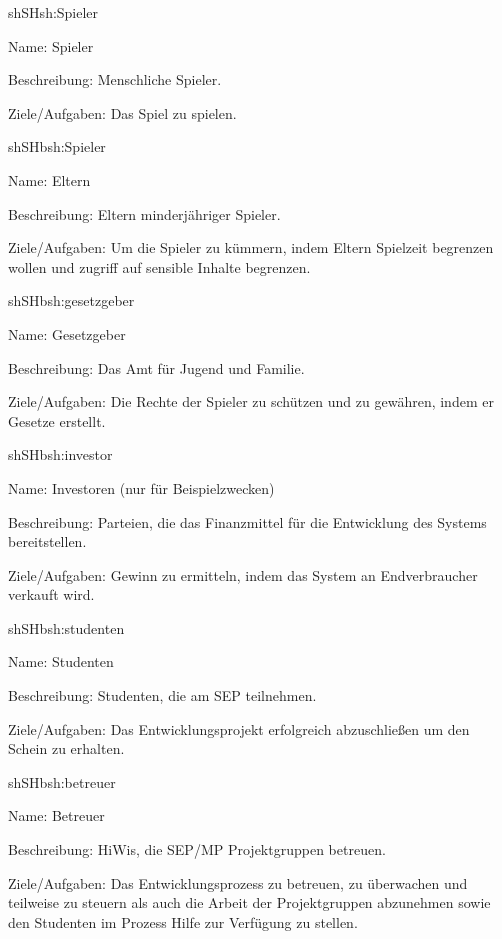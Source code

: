 \begin{description}[leftmargin=5em, style=sameline]
	
	\begin{lhp}{sh}{SH}{sh:Spieler}
		\item [Name:] Spieler
		\item [Beschreibung:] Menschliche Spieler.
		\item [Ziele/Aufgaben:] Das Spiel zu spielen.
	\end{lhp}
	
	\begin{lhp}{sh}{SH}{bsh:Spieler}
		\item [Name:] Eltern
		\item [Beschreibung:] Eltern minderjähriger Spieler.
		\item [Ziele/Aufgaben:] Um die Spieler zu kümmern, indem Eltern Spielzeit begrenzen wollen und zugriff auf sensible Inhalte begrenzen.
	\end{lhp}
	
	\begin{lhp}{sh}{SH}{bsh:gesetzgeber}
		\item [Name:] Gesetzgeber
		\item [Beschreibung:] Das Amt für Jugend und Familie.
		\item [Ziele/Aufgaben:] Die Rechte der Spieler zu schützen und zu gewähren, indem er Gesetze erstellt.
	\end{lhp}
	
	\begin{lhp}{sh}{SH}{bsh:investor}
		\item [Name:] Investoren (nur für Beispielzwecken)
		\item [Beschreibung:] Parteien, die das Finanzmittel für die Entwicklung des Systems bereitstellen.
		\item [Ziele/Aufgaben:] Gewinn zu ermitteln, indem das System an Endverbraucher verkauft wird.
	\end{lhp}

	\begin{lhp}{sh}{SH}{bsh:studenten}
		\item [Name:] Studenten
		\item [Beschreibung:] Studenten, die am SEP teilnehmen.
		\item [Ziele/Aufgaben:] Das Entwicklungsprojekt erfolgreich abzuschließen um den Schein zu erhalten.
	\end{lhp}
	
	\begin{lhp}{sh}{SH}{bsh:betreuer}
		\item [Name:] Betreuer
		\item [Beschreibung:] HiWis, die SEP/MP Projektgruppen betreuen.
		\item [Ziele/Aufgaben:] Das Entwicklungsprozess zu betreuen, zu überwachen und teilweise zu steuern
								 als auch die Arbeit der Projektgruppen abzunehmen sowie den Studenten im
								 Prozess Hilfe zur Verfügung zu stellen. 
	\end{lhp}
	

\end{description}
